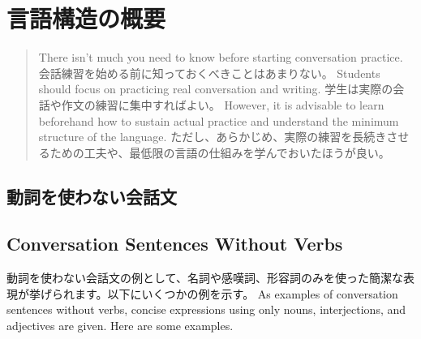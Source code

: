 \documentclass[uplatex,dvipdfmx,b5paper,english,10pt]{jsbook}
\newif\ifOUTLINEOFLANGUAGESTRUCTURE
\newif\ifVOICE
\newif\ifSHORTNOTES
\begin{document}
\ifVOICE

\fi%

\ifSHORTNOTES

\fi%

\tableofcontents

\mainmatter


\ifOUTLINEOFLANGUAGESTRUCTURE
\ifEnglish
\chapter{Outline of Language Structure}
\else
\chapter{言語構造の概要}
\fi

\begin{abstract}
\ifEnglish
There isn't much you need to know before starting conversation practice.
\else
会話練習を始める前に知っておくべきことはあまりない。
\fi
\ifEnglish
Students should focus on practicing real conversation and writing.
\else
学生は実際の会話や作文の練習に集中すればよい。
\fi
\ifEnglish
However, it is advisable to learn beforehand how to sustain actual practice and understand the minimum structure of the language.
\else
ただし、あらかじめ、実際の練習を長続きさせるための工夫や、最低限の言語の仕組みを学んでおいたほうが良い。
\fi
\end{abstract}


\ifJapanese
  \section{動詞を使わない会話文}
\else
  \section{Conversation Sentences Without Verbs}
\fi

\ifJapanese
動詞を使わない会話文の例として、名詞や感嘆詞、形容詞のみを使った簡潔な表現が挙げられます。以下にいくつかの例を示す。
\else
As examples of conversation sentences without verbs, concise expressions using only nouns, interjections, and adjectives are given. Here are some examples.
\fi
\end{document}

